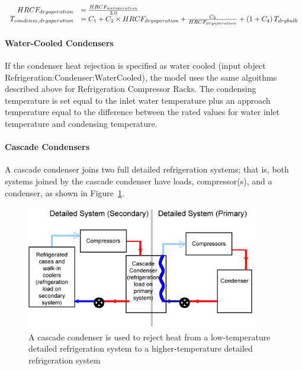\begin{equation}
  \begin{array}{rl}
    HRCF_{dry operation} &= \frac{HRCF_{wet operation}}{3.0} \\
    T_{condense,dry operation} &= {C_1} + {C_2} \times HRCF_{dry operation} + \frac{C_3}{HRCF_{dry operation}} + \PB{1 + C_4} T_{drybulb}
  \end{array}
\end{equation}

\paragraph{Water-Cooled Condensers}\label{water-cooled-condensers}

If the condenser heat rejection is specified as water cooled (input object Refrigeration:Condenser:WaterCooled), the model uses the same algoithms described above for Refrigeration Compressor Racks. The condensing temperature is set equal to the inlet water temperature plus an approach temperature equal to the difference between the rated values for water inlet temperature and condensing temperature.

\paragraph{Cascade Condensers}\label{cascade-condensers}

A cascade condenser joins two full detailed refrigeration systems; that is, both systems joined by the cascade condenser have loads, compressor(s), and a condenser, as shown in Figure~\ref{fig:a-cascade-condenser-is-used-to-reject-heat}.

\begin{figure}[hbtp] %
\centering
\includegraphics[width=0.9\textwidth, height=0.9\textheight, keepaspectratio=true]{media/image6310.png}
\caption{A cascade condenser is used to reject heat from a low-temperature detailed refrigeration system to a higher-temperature detailed refrigeration system \protect \label{fig:a-cascade-condenser-is-used-to-reject-heat}}
\end{figure}

